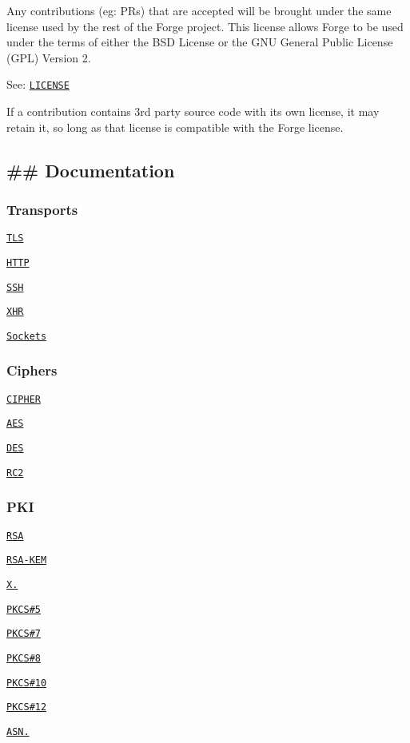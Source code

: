 Any contributions (eg\+: P\+Rs) that are accepted will be brought under the same license used by the rest of the Forge project. This license allows Forge to be used under the terms of either the B\+SD License or the G\+NU General Public License (G\+PL) Version 2.

See\+: \href{https://github.com/digitalbazaar/forge/blob/cbebca3780658703d925b61b2caffb1d263a6c1d/LICENSE}{\tt L\+I\+C\+E\+N\+SE}

If a contribution contains 3rd party source code with its own license, it may retain it, so long as that license is compatible with the Forge license.

\subsection*{\#\# Documentation }

\subsubsection*{Transports}


\begin{DoxyItemize}
\item \href{#tls}{\tt T\+LS}
\item \href{#http}{\tt H\+T\+TP}
\item \href{#ssh}{\tt S\+SH}
\item \href{#xhr}{\tt X\+HR}
\item \href{#socket}{\tt Sockets}
\end{DoxyItemize}

\subsubsection*{Ciphers}


\begin{DoxyItemize}
\item \href{#cipher}{\tt C\+I\+P\+H\+ER}
\item \href{#aes}{\tt A\+ES}
\item \href{#des}{\tt D\+ES}
\item \href{#rc2}{\tt R\+C2}
\end{DoxyItemize}

\subsubsection*{P\+KI}


\begin{DoxyItemize}
\item \href{#rsa}{\tt R\+SA}
\item \href{#rsakem}{\tt R\+S\+A-\/\+K\+EM}
\item \href{#x509}{\tt X.}
\item \href{#pkcs5}{\tt P\+K\+CS\#5}
\item \href{#pkcs7}{\tt P\+K\+CS\#7}
\item \href{#pkcs8}{\tt P\+K\+CS\#8}
\item \href{#pkcs10}{\tt P\+K\+CS\#10}
\item \href{#pkcs12}{\tt P\+K\+CS\#12}
\item \href{#asn}{\tt A\+S\+N.}
\end{DoxyItemize}

